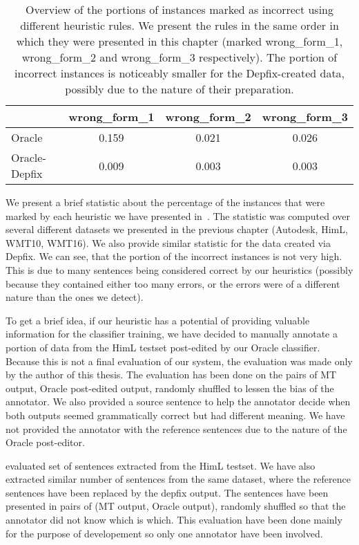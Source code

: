 \begin{table*}[t]
\centering
\small

\begin{tabular}{lccc}
  &  wrong\_form\_1  &  wrong\_form\_2  &  wrong\_form\_3  \\
\hline
Oracle  &  0.159  &  0.021  &  0.026  \\
Oracle-Depfix  & 0.009  &  0.003  &  0.003  \\
\end{tabular}
\caption{
Overview of the portions of instances marked as incorrect using different heuristic rules. We present
the rules in the same order in which they were presented in this chapter (marked wrong\_form\_1, wrong\_form\_2
and wrong\_form\_3 respectively). The portion of incorrect instances is noticeably smaller for the Depfix-created
data, possibly due to the nature of their preparation.
}
\label{marked-stats}
\end{table*}


We present a brief statistic about the percentage of the instances that were marked by each
heuristic we have presented in~. The statistic was computed over several different
datasets we presented in the previous chapter (Autodesk, HimL, WMT10, WMT16). We also provide
similar statistic for the data created via Depfix. We can see, that the portion of the incorrect instances
is not very high. This is due to many sentences being considered correct by our heuristics (possibly because
they contained either too many errors, or the errors were of a different nature than the ones we detect).

To get a brief idea, if our heuristic has a potential of providing valuable information for the classifier
training, we have decided to manually annotate a portion of data from the HimL testset post-edited by our
Oracle classifier. Because this is not a final evaluation of our system, the evaluation was made only
by the author of this thesis. The evaluation has been done on the pairs of MT output, Oracle post-edited
output, randomly shuffled to lessen the bias of the annotator. We also provided a source sentence
to help the annotator decide when both outputs seemed grammatically correct but had different meaning.
We have not provided the annotator with the reference sentences due to the nature of the Oracle post-editor.

 evaluated set of sentences extracted from the HimL testset. We have also extracted
similar number of sentences from the same dataset, where the reference sentences have been replaced
by the depfix output. The sentences have been presented in pairs of (MT output, Oracle output),
randomly shuffled so that the annotator did not know which is which.
This evaluation have been done mainly for the purpose of developement
so only one annotator have been involved.

